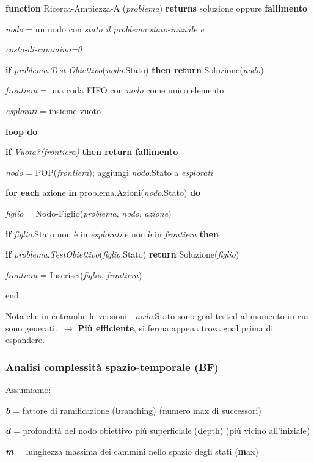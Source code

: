 \begin{flushleft}
	\textbf{function} Ricerca-Ampiezza-A (\textit{problema}) \textbf{returns} soluzione oppure \textbf{fallimento}

	\quad \textit{nodo} = un nodo con \textit{stato il problema.stato-iniziale e}

	\quad \textit{costo-di-cammino=0}

	\quad \textbf{if} \textit{problema}.\textit{Test-Obiettivo}(\textit{nodo}.Stato) \textbf{then return} Soluzione(\textit{nodo})

	\quad \textit{frontiera} = una coda FIFO con \textit{nodo} come unico elemento

	\quad \textit{esplorati} = insieme vuoto

	\quad \textbf{loop do}

	\qquad \textbf{if} \textit{Vuota?(frontiera)} \textbf{then return fallimento}

	\qquad \textit{nodo} = POP(\textit{frontiera}); aggiungi \textit{nodo}.Stato a \textit{esplorati}

	\qquad \textbf{for each} azione \textbf{in} problema.Azioni(\textit{nodo}.Stato) \textbf{do}

	\qquad \quad \textit{figlio} = Nodo-Figlio(\textit{problema}, \textit{nodo}, \textit{azione})

	\qquad \quad \textbf{if} \textit{figlio}.Stato non è in \textit{esplorati} e non è in \textit{frontiera} \textbf{then}

	\qquad \qquad \textbf{if} \textit{problema}.\textit{TestObiettivo}(\textit{figlio}.Stato) \textbf{return} Soluzione(\textit{figlio})

	\qquad \qquad \textit{frontiera} = Inserisci(\textit{figlio}, \textit{frontiera})

	end
\end{flushleft}

\noindent Nota che in entrambe le versioni i \textit{nodo}.Stato sono goal-tested al momento in cui sono generati.\ $\rightarrow$ \textbf{Più efficiente}, si ferma appena trova goal prima di espandere.

\subsubsection{Analisi complessità spazio-temporale (BF)}

\begin{flushleft}
	Assumiamo:\

	\textbf{\textit{b}} = fattore di ramificazione (\textbf{b}ranching) (numero max di successori)

	\textbf{\textit{d}} = profondità del nodo obiettivo più superficiale (\textbf{d}epth) (più vicino all'iniziale)

	\textbf{\textit{m}} = lunghezza massima dei cammini nello spazio degli stati (\textbf{m}ax)
\end{flushleft}

